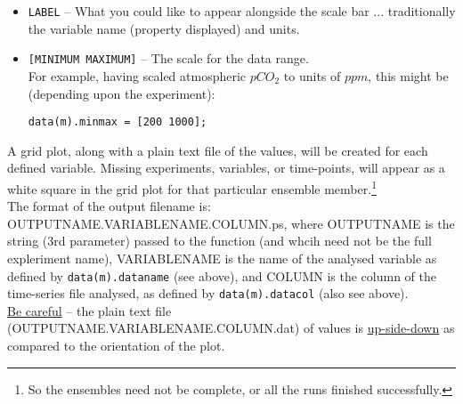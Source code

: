 \begin{enumerate}
\begin{itemize}[noitemsep]
\begin{verbatim}
data(m).scale = 1.0E6;
\end{verbatim}\normalsize\vspace{-1mm}
would multiply the time-series value by \(10^{6}\) and in the example of atmospheric \(pCO_{2}\), produce the data in units of \(\mu atm\) (or \(ppm\)).
\\The scaling need not be a simple multiple of orders-of-magnitude, and e.g.
\vspace{-1mm}\small\begin{verbatim}
data(m).scale = 12.0E-15;
\end{verbatim}\normalsize\vspace{-1mm}
will convert \(molC\) into \(PgC\).
\vspace{1mm}
\item \texttt{LABEL} -- What you could like to appear alongside the scale bar ... traditionally the variable name (property displayed) and units.
\vspace{1mm}
\item \texttt{[MINIMUM MAXIMUM]} -- The scale for the data range.
\\For example, having scaled atmospheric \(pCO_{2}\) to units of \(ppm\), this might be (depending upon the experiment):
\vspace{-1mm}\small\begin{verbatim}
data(m).minmax = [200 1000];
\end{verbatim}\normalsize\vspace{-1mm}
\end{itemize}

\vspace{1mm}

A grid plot, along with a plain text file of the values, will be created for each defined variable. Missing experiments, variables, or time-points, will appear as a white square in the grid plot for that particular ensemble member.\footnote{So the ensembles need not be complete, or all the runs finished successfully.}
\\The format of the output filename is: \textsf{\footnotesize OUTPUTNAME.VARIABLENAME.COLUMN.ps}, where \textsf{\footnotesize OUTPUTNAME} is the string (3rd parameter) passed to the function (and whcih need not be the full expleriment name), \textsf{\footnotesize VARIABLENAME} is the name of the analysed variable as defined by \texttt{data(m).dataname} (see above), and \textsf{\footnotesize COLUMN} is the column of the time-series file analysed, as defined by \texttt{data(m).datacol} (also see above).
\\\uline{Be careful} -- the plain text file (\textsf{\footnotesize OUTPUTNAME.VARIABLENAME.COLUMN.dat}) of values is \uline{up-side-down} as compared to the orientation of the plot.


\end{enumerate}
